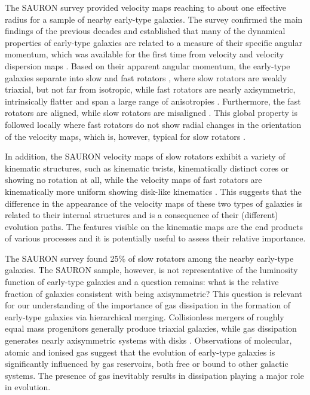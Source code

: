 \documentclass[usenatbib,usegraphicx]{mn2e}
\begin{document}
The SAURON survey \citep{2002MNRAS.329..513D} provided velocity maps reaching to about one effective radius for a sample of nearby early-type galaxies. The survey confirmed the main findings of the previous decades and established that many of the dynamical properties of early-type galaxies are related to a measure of their specific angular momentum, which was available for the first time from velocity and velocity dispersion maps \citep{2004MNRAS.352..721E}. Based on their apparent angular momentum, the early-type galaxies separate into slow and fast rotators \citep{2007MNRAS.379..401E}, where slow rotators are weakly triaxial, but not far from isotropic, while fast rotators are nearly axisymmetric, intrinsically flatter and span a large range of anisotropies \citep{2007MNRAS.379..418C}.  Furthermore, the fast rotators are aligned, while slow rotators are misaligned \citep{2004MNRAS.352..721E,2007MNRAS.379..418C}. This global property is followed locally where fast rotators do not show radial changes in the orientation of the velocity maps, which is, however, typical for slow rotators  \citep{2008MNRAS.390...93K}.

In addition, the SAURON velocity maps of slow rotators exhibit a variety of kinematic structures, such as kinematic twists, kinematically distinct cores or showing no rotation at all, while the velocity maps of fast rotators are kinematically more uniform showing disk-like kinematics \citep{2008MNRAS.390...93K}. This suggests that the difference in the appearance of the velocity maps of these two types of galaxies is related to their internal structures and is a consequence of their (different) evolution paths. The features visible on the kinematic maps are the end products of various processes and it is potentially useful to assess their relative importance. 

The SAURON survey found 25\% of slow rotators among the nearby early-type galaxies. The SAURON sample, however, is not representative of the luminosity function of early-type galaxies and a question remains: what is the relative fraction of galaxies consistent with being axisymmetric? This question is relevant for our understanding of the importance of gas dissipation in the formation of early-type galaxies via hierarchical merging. Collisionless mergers of roughly equal mass progenitors generally produce triaxial galaxies, while gas dissipation generates nearly axisymmetric systems with disks \citep[e.g.][]{2006MNRAS.372..839N, 2007MNRAS.376..997J, 2009ApJ...705..920H}. Observations of molecular, atomic and ionised gas  \citep{2002AJ....123..729O,2006MNRAS.366.1151S, 2006MNRAS.371..157M, 2008ApJ...676..317Y,2008A&A...483...57S, 2009MNRAS.393.1255C,2010MNRAS.409..500O} suggest that the evolution of early-type galaxies is significantly influenced by gas reservoirs, both free or bound to other galactic systems. The presence of gas inevitably results in dissipation playing a major role in evolution.
\end{document}
